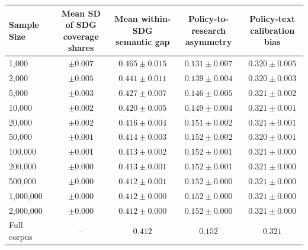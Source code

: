 \begin{tabular}{lcccc}
\toprule
Sample Size & \shortstack{Mean SD of SDG\\coverage shares} & \shortstack{Mean within-SDG\\semantic gap} & \shortstack{Policy-to-research\\asymmetry} & \shortstack{Policy-text\\calibration bias} \\
\midrule
1,000 & $\pm 0.007$ & $0.465 \pm 0.015$ & $0.131 \pm 0.007$ & $0.320 \pm 0.005$ \\
2,000 & $\pm 0.005$ & $0.441 \pm 0.011$ & $0.139 \pm 0.004$ & $0.320 \pm 0.003$ \\
5,000 & $\pm 0.003$ & $0.427 \pm 0.007$ & $0.146 \pm 0.005$ & $0.321 \pm 0.002$ \\
10,000 & $\pm 0.002$ & $0.420 \pm 0.005$ & $0.149 \pm 0.004$ & $0.321 \pm 0.001$ \\
20,000 & $\pm 0.002$ & $0.416 \pm 0.004$ & $0.151 \pm 0.002$ & $0.321 \pm 0.001$ \\
50,000 & $\pm 0.001$ & $0.414 \pm 0.003$ & $0.152 \pm 0.002$ & $0.320 \pm 0.001$ \\
100,000 & $\pm 0.001$ & $0.413 \pm 0.002$ & $0.152 \pm 0.001$ & $0.321 \pm 0.000$ \\
200,000 & $\pm 0.000$ & $0.413 \pm 0.001$ & $0.152 \pm 0.001$ & $0.321 \pm 0.000$ \\
500,000 & $\pm 0.000$ & $0.412 \pm 0.001$ & $0.152 \pm 0.000$ & $0.321 \pm 0.000$ \\
1,000,000 & $\pm 0.000$ & $0.412 \pm 0.000$ & $0.152 \pm 0.000$ & $0.321 \pm 0.000$ \\
2,000,000 & $\pm 0.000$ & $0.412 \pm 0.000$ & $0.152 \pm 0.000$ & $0.321 \pm 0.000$ \\
Full corpus & -- & $0.412$ & $0.152$ & $0.321$ \\
\bottomrule
\end{tabular}
